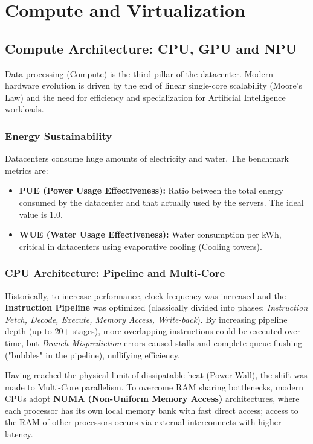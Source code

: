 \chapter{Compute and Virtualization}

\section{Compute Architecture: CPU, GPU and NPU}
Data processing (Compute) is the third pillar of the datacenter. Modern hardware evolution is driven by the end of linear single-core scalability (Moore's Law) and the need for efficiency and specialization for Artificial Intelligence workloads.

\subsection{Energy Sustainability}
Datacenters consume huge amounts of electricity and water. The benchmark metrics are:
\begin{itemize}
    \item \textbf{PUE (Power Usage Effectiveness):} Ratio between the total energy consumed by the datacenter and that actually used by the servers. The ideal value is 1.0.
    \item \textbf{WUE (Water Usage Effectiveness):} Water consumption per kWh, critical in datacenters using evaporative cooling (Cooling towers).
\end{itemize}

\subsection{CPU Architecture: Pipeline and Multi-Core}
Historically, to increase performance, clock frequency was increased and the \textbf{Instruction Pipeline} was optimized (classically divided into phases: \textit{Instruction Fetch, Decode, Execute, Memory Access, Write-back}). By increasing pipeline depth (up to 20+ stages), more overlapping instructions could be executed over time, but \textit{Branch Misprediction} errors caused stalls and complete queue flushing ("bubbles" in the pipeline), nullifying efficiency. 

Having reached the physical limit of dissipatable heat (Power Wall), the shift was made to Multi-Core parallelism. To overcome RAM sharing bottlenecks, modern CPUs adopt \textbf{NUMA (Non-Uniform Memory Access)} architectures, where each processor has its own local memory bank with fast direct access; access to the RAM of other processors occurs via external interconnects with higher latency.

